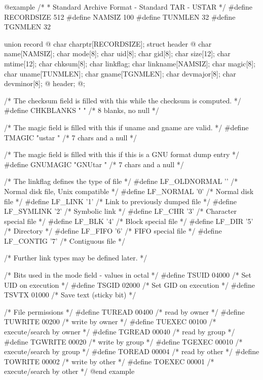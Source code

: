 @example
/*
 * Standard Archive Format - Standard TAR - USTAR
 */
#define  RECORDSIZE  512
#define  NAMSIZ      100
#define  TUNMLEN      32
#define  TGNMLEN      32

union record @{
    char        charptr[RECORDSIZE];
    struct header @{
        char    name[NAMSIZ];
        char    mode[8];
        char    uid[8];
        char    gid[8];
        char    size[12];
        char    mtime[12];
        char    chksum[8];
        char    linkflag;
        char    linkname[NAMSIZ];
        char    magic[8];
        char    uname[TUNMLEN];
        char    gname[TGNMLEN];
        char    devmajor[8];
        char    devminor[8];
    @} header;
@};

/* The checksum field is filled with this while the checksum is computed. */
#define    CHKBLANKS    "        "        /* 8 blanks, no null */

/* The magic field is filled with this if uname and gname are valid. */
#define    TMAGIC    "ustar  "        /* 7 chars and a null */

/* The magic field is filled with this if this is a GNU format dump entry */
#define    GNUMAGIC  "GNUtar "        /* 7 chars and a null */

/* The linkflag defines the type of file */
#define  LF_OLDNORMAL '\0'       /* Normal disk file, Unix compatible */
#define  LF_NORMAL    '0'        /* Normal disk file */
#define  LF_LINK      '1'        /* Link to previously dumped file */
#define  LF_SYMLINK   '2'        /* Symbolic link */
#define  LF_CHR       '3'        /* Character special file */
#define  LF_BLK       '4'        /* Block special file */
#define  LF_DIR       '5'        /* Directory */
#define  LF_FIFO      '6'        /* FIFO special file */
#define  LF_CONTIG    '7'        /* Contiguous file */

/* Further link types may be defined later. */

/* Bits used in the mode field - values in octal */
#define  TSUID    04000        /* Set UID on execution */
#define  TSGID    02000        /* Set GID on execution */
#define  TSVTX    01000        /* Save text (sticky bit) */

/* File permissions */
#define  TUREAD   00400        /* read by owner */
#define  TUWRITE  00200        /* write by owner */
#define  TUEXEC   00100        /* execute/search by owner */
#define  TGREAD   00040        /* read by group */
#define  TGWRITE  00020        /* write by group */
#define  TGEXEC   00010        /* execute/search by group */
#define  TOREAD   00004        /* read by other */
#define  TOWRITE  00002        /* write by other */
#define  TOEXEC   00001        /* execute/search by other */
@end example

